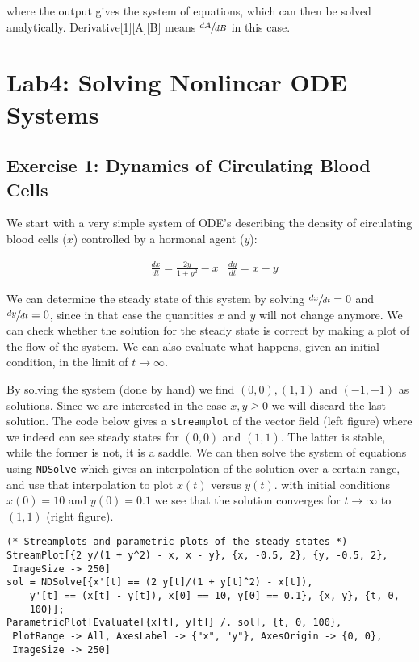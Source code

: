 \documentclass[11pt,a4paper,onecolumn]{article}
\begin{document}
where the output gives the system of equations, which can then be solved analytically. Derivative[1][A][B] means $\sfrac{dA}{dB}$ in this case.

\newpage

\section{Lab4: Solving Nonlinear ODE Systems}
\subsection{Exercise 1: Dynamics of Circulating Blood Cells}

We start with a very simple system of ODE's describing the density of circulating blood cells ($x$) controlled by a hormonal agent ($y$):

\begin{align*}
  &\frac{dx}{dt} = \frac{2y}{1 + y^2} - x \nonumber
  &\frac{dy}{dt} = x - y
\end{align*}

We can determine the steady state of this system by solving $\sfrac{dx}{dt} = 0$ and $\sfrac{dy}{dt} = 0$, since in that case the quantities $x$ and $y$ will not change anymore. We can check whether the solution for the steady state is correct by making a plot of the flow of the system. We can also evaluate what happens, given an initial condition, in the limit of $t \rightarrow \infty$.

By solving the system (done by hand) we find $(0,0), (1,1)$ and $(-1,-1)$ as solutions. Since we are interested in the case $x,y \geq 0$ we will discard the last solution. The code below gives a \texttt{streamplot} of the vector field (left figure) where we indeed can see steady states for $(0,0)$ and $(1,1)$. The latter is stable, while the former is not, it is a saddle. We can then solve the system of equations using \texttt{NDSolve} which gives an interpolation of the solution over a certain range, and use that interpolation to plot $x(t)$ versus $y(t)$. with initial conditions $x(0) = 10$ and $y(0) = 0.1$ we see that the solution converges for $t \rightarrow \infty$ to $(1,1)$ (right figure).

\begin{lstlisting}[mathescape]
(* Streamplots and parametric plots of the steady states *)
StreamPlot[{2 y/(1 + y^2) - x, x - y}, {x, -0.5, 2}, {y, -0.5, 2}, 
 ImageSize -> 250]
sol = NDSolve[{x'[t] == (2 y[t]/(1 + y[t]^2) - x[t]), 
    y'[t] == (x[t] - y[t]), x[0] == 10, y[0] == 0.1}, {x, y}, {t, 0, 
    100}];
ParametricPlot[Evaluate[{x[t], y[t]} /. sol], {t, 0, 100}, 
 PlotRange -> All, AxesLabel -> {"x", "y"}, AxesOrigin -> {0, 0}, 
 ImageSize -> 250]
\end{lstlisting}
\end{document}
